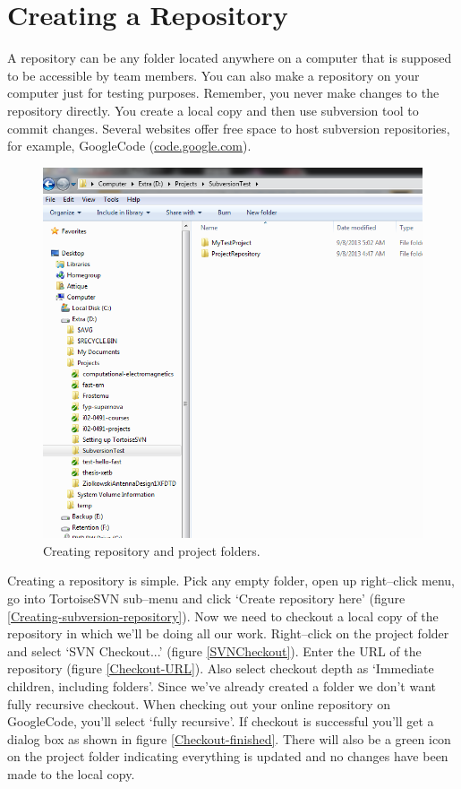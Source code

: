 \documentclass[12pt,a4paper]{article}
\begin{document}
\section{Creating a Repository}
A repository can be any folder located anywhere on a computer that is supposed to be accessible by team members. You can also make a repository on your computer just for testing purposes. Remember, you never make changes to the repository directly. You create a local copy and then use subversion tool to commit changes. Several websites offer free space to host subversion repositories, for example, GoogleCode (\url{code.google.com}).
\begin{figure}[H]
\centering
\includegraphics[scale=0.75]{RepositoryandProjectFolders.png}
\caption{Creating repository and project folders.}
\label{Repository-and-project-folders}
\end{figure}
Creating a repository is simple. Pick any empty folder, open up right--click menu, go into TortoiseSVN sub--menu and click `Create repository here' (figure \ref{Creating-subversion-repository}). Now we need to checkout a local copy of the repository in which we'll be doing all our work. Right--click on the project folder and select `SVN Checkout...' (figure \ref{SVNCheckout}). Enter the URL of the repository (figure \ref{Checkout-URL}). Also select checkout depth as `Immediate children, including folders'. Since we've already created a folder we don't want fully recursive checkout. When checking out your online repository on GoogleCode, you'll select `fully recursive'. If checkout is successful you'll get a dialog box as shown in figure \ref{Checkout-finished}. There will also be a green icon on the project folder indicating everything is updated and no changes have been made to the local copy.
\end{document}
